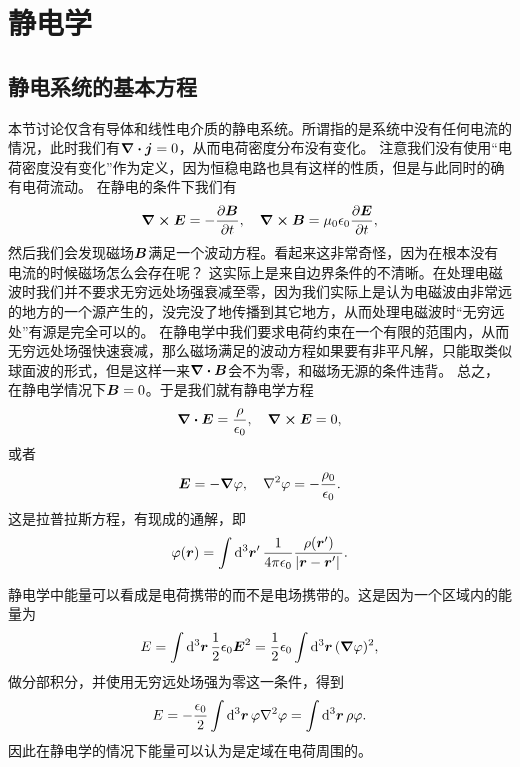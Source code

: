 \chapter{静电学}

\section{静电系统的基本方程}

本节讨论仅含有导体和线性电介质的静电系统。所谓指的是系统中没有任何电流的情况，此时我们有$\div{\vb*{j}}=0$，从而电荷密度分布没有变化。
注意我们没有使用“电荷密度没有变化”作为定义，因为恒稳电路也具有这样的性质，但是与此同时的确有电荷流动。
在静电的条件下我们有
\[
    \curl{\vb*{E}} = - \pdv{\vb*{B}}{t}, \quad \curl{\vb*{B}} = \mu_0 \epsilon_0 \pdv{\vb*{E}}{t},
\]
然后我们会发现磁场$\vb*{B}$满足一个波动方程。看起来这非常奇怪，因为在根本没有电流的时候磁场怎么会存在呢？
这实际上是来自边界条件的不清晰。在处理电磁波时我们并不要求无穷远处场强衰减至零，因为我们实际上是认为电磁波由非常远的地方的一个源产生的，没完没了地传播到其它地方，从而处理电磁波时“无穷远处”有源是完全可以的。
在静电学中我们要求电荷约束在一个有限的范围内，从而无穷远处场强快速衰减，那么磁场满足的波动方程如果要有非平凡解，只能取类似球面波的形式，但是这样一来$\div{\vb*{B}}$会不为零，和磁场无源的条件违背。
总之，在静电学情况下$\vb*{B}=0$。于是我们就有静电学方程
\begin{equation}
    \div{\vb*{E}} = \frac{\rho}{\epsilon_0}, \quad \curl{\vb*{E}} = 0,
    \label{eq:static-e-field}
\end{equation}
或者
\begin{equation}
    \vb*{E} = - \grad{\varphi}, \quad \laplacian{\varphi} = - \frac{\rho_0}{\epsilon_0}.
    \label{eq:static-phi-field}
\end{equation}
这是拉普拉斯方程，有现成的通解，即
\begin{equation}
    \varphi(\vb*{r}) = \int \dd[3]{\vb*{r}'} \frac{1}{4\pi \epsilon_0} \frac{\rho(\vb*{r}')}{\abs*{\vb*{r} - \vb*{r}'}}.
    \label{eq:from-q-to-phi}
\end{equation}

静电学中能量可以看成是电荷携带的而不是电场携带的。这是因为一个区域内的能量为
\[
    E = \int \dd[3]{\vb*{r}} \frac{1}{2} \epsilon_0 \vb*{E}^2 = \frac{1}{2} \epsilon_0 \int \dd[3]{\vb*{r}} (\grad{\varphi})^2,
\]
做分部积分，并使用无穷远处场强为零这一条件，得到
\begin{equation}
    E = - \frac{\epsilon_0}{2} \int \dd[3]{\vb*{r}} \varphi \laplacian{\varphi} = \int \dd[3]{\vb*{r}} \rho \varphi.
\end{equation}
因此在静电学的情况下能量可以认为是定域在电荷周围的。

